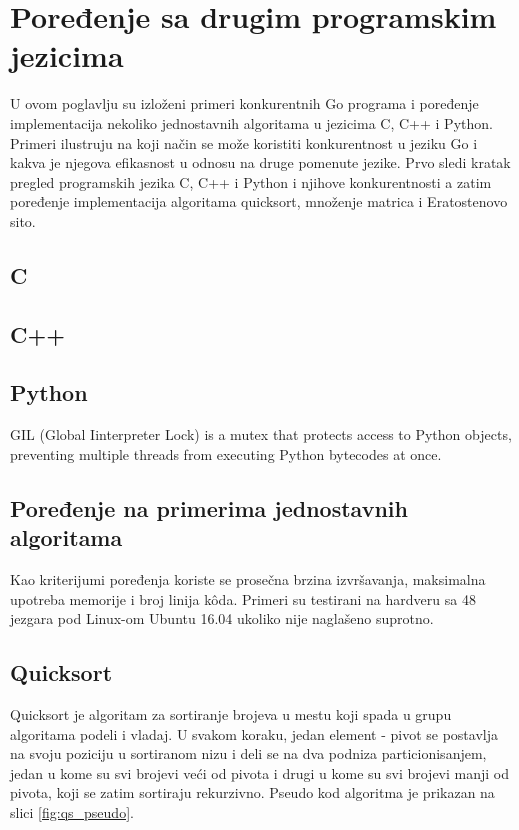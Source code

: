 \documentclass[12pt,oneside]{memoir}
\begin{document}

\chapter {Poređenje sa drugim programskim jezicima}
U ovom poglavlju su izloženi primeri konkurentnih Go programa i poređenje implementacija nekoliko jednostavnih algoritama u jezicima C, C++ i Python. Primeri ilustruju na koji način se može koristiti konkurentnost u jeziku Go i kakva je njegova efikasnost u odnosu na druge pomenute jezike. Prvo sledi kratak pregled programskih jezika C, C++ i Python i njihove konkurentnosti a zatim poređenje implementacija algoritama quicksort, množenje matrica i Eratostenovo sito.

\section{C}

\section{C++}

\section{Python}
\label{gil} GIL (Global Iinterpreter Lock) is a mutex that protects access to Python objects, preventing multiple threads from executing Python bytecodes at once.

\section{Poređenje na primerima jednostavnih algoritama}
Kao kriterijumi poređenja koriste se prosečna brzina izvršavanja, maksimalna upotreba memorije i broj linija k\^{o}da. Primeri su testirani na hardveru sa 48 jezgara pod Linux-om Ubuntu 16.04 ukoliko nije naglašeno suprotno. 



\section{Quicksort}
Quicksort je algoritam za sortiranje brojeva u mestu koji spada u grupu algoritama podeli i vladaj. U svakom koraku, jedan element - pivot se postavlja na svoju poziciju u sortiranom nizu i deli se na dva podniza particionisanjem, jedan u kome su svi brojevi veći od pivota i drugi u kome su svi brojevi manji od pivota, koji se zatim sortiraju rekurzivno.  Pseudo kod algoritma je prikazan na slici \ref{fig:qs_pseudo}. 
\end{document}
